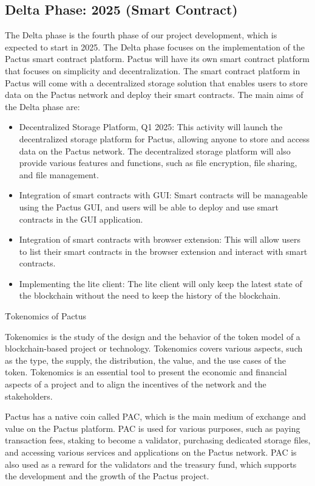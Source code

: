 \documentclass{novel}
\begin{document}
\subsection{Delta Phase: 2025 (Smart Contract)}
The Delta phase is the fourth phase of our project development, which is expected to start in 2025. The Delta phase focuses on the implementation of the Pactus smart contract platform. Pactus will have its own smart contract platform that focuses on simplicity and decentralization. The smart contract platform in Pactus will come with a decentralized storage solution that enables users to store data on the Pactus network and deploy their smart contracts. The main aims of the Delta phase are:
\begin{itemize}
  \item
        Decentralized Storage Platform, Q1 2025: This activity will launch the decentralized storage platform for Pactus, allowing anyone to store and access data on the Pactus network. The decentralized storage platform will also provide various features and functions, such as file encryption, file sharing, and file management.
  \item
        Integration of smart contracts with GUI: Smart contracts will be manageable using the Pactus GUI, and users will be able to deploy and use smart contracts in the GUI application.
  \item
        Integration of smart contracts with browser extension: This will allow users to list their smart contracts in the browser extension and interact with smart contracts.
  \item
        Implementing the lite client: The lite client will only keep the latest state of the blockchain without the need to keep the history of the blockchain.
\end{itemize}



\h{Tokenomics of Pactus}

Tokenomics is the study of the design and the behavior of the token model of a blockchain-based project or technology. Tokenomics covers various aspects, such as the type, the supply, the distribution, the value, and the use cases of the token. Tokenomics is an essential tool to present the economic and financial aspects of a project and to align the incentives of the network and the stakeholders.

Pactus has a native coin called PAC, which is the main medium of exchange and value on the Pactus platform. PAC is used for various purposes, such as paying transaction fees, staking to become a validator, purchasing dedicated storage files, and accessing various services and applications on the Pactus network. PAC is also used as a reward for the validators and the treasury fund, which supports the development and the growth of the Pactus project.
\end{document}
